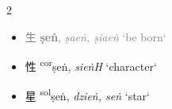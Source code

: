 \begin{multicols}{2}
\begin{minipage}{\columnwidth}
\begin{itemize}[leftmargin=*, labelsep=0.5em]

\end{itemize}
\end{minipage}

\vspace{8mm}

\begin{minipage}{\columnwidth}
\begin{itemize}[leftmargin=*, labelsep=0.5em]  
    \item

    \textcolor{gray}{{\Large{生}} {\large{\textbf{ṣeṅ}}}, \textit{ṣaeṅ, ṣiaeṅ} `be born`}




    \item {\Large{性}} %
    {\large{{\textsuperscript{cor}}ṣeṅ}}, \textit{sieṅH}
    `character`



    \item {\Large{星}} %
    {\large{{\textsuperscript{sol}}ṣeṅ}},
    \textit{dzieṅ, seṅ}
    `star`
\begin{itemize}



\end{itemize}
\end{itemize}
\end{minipage}
\end{multicols}
